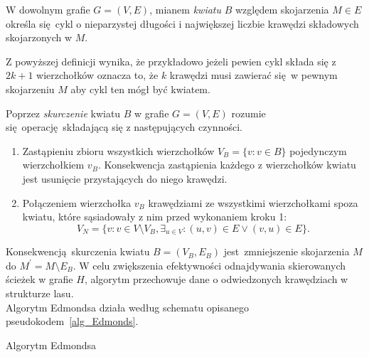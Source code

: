 \par{
  \begin{definition}
    W dowolnym grafie $G=(V, E)$, mianem \emph{kwiatu} $B$ względem skojarzenia $M \in E$ określa się cykl o nieparzystej długości i największej liczbie krawędzi składowych skojarzonych w $M$. 
  \end{definition}
  Z powyższej definicji wynika, że przykładowo jeżeli pewien cykl składa się z $2k + 1$ wierzchołków oznacza to, że $k$ krawędzi musi zawierać się w pewnym skojarzeniu $M$ aby cykl ten mógł być kwiatem.
  \begin{definition}
    Poprzez \emph{skurczenie} kwiatu $B$ w grafie $G=(V, E)$ rozumie się operację składającą się z następujących czynności.
    \begin{enumerate}
       \item Zastąpieniu zbioru wszystkich wierzchołków $V_B=\{v: v \in B\}$ pojedynczym wierzchołkiem $v_B$. Konsekwencja zastąpienia każdego z wierzchołków kwiatu jest usunięcie przystających do niego krawędzi.
       \item Połączeniem wierzchołka $v_B$ krawędziami ze wszystkimi wierzchołkami spoza kwiatu, które sąsiadowały z nim przed wykonaniem kroku 1: \[V_N=\{v: v \in V \setminus V_B, \exists_{u \in V}:(u,v)\in E \lor (v, u)\in E\}.\]
     \end{enumerate}
  \end{definition}
  Konsekwencją skurczenia kwiatu $B=(V_B, E_B)$ jest zmniejszenie skojarzenia $M$ do $M^\prime = M \setminus E_B$.
  W celu zwiększenia efektywności odnajdywania skierowanych ścieżek w grafie $H$, algorytm przechowuje dane o odwiedzonych krawędziach w strukturze lasu.\\
  Algorytm Edmondsa działa według schematu opisanego pseudokodem~\ref{alg_Edmonds}.
  \begin{algorithm}
    \caption{Algorytm Edmondsa}\label{alg_Edmonds}
    \begin{algorithmic}[1]




\end{algorithmic}
\end{algorithm}}
